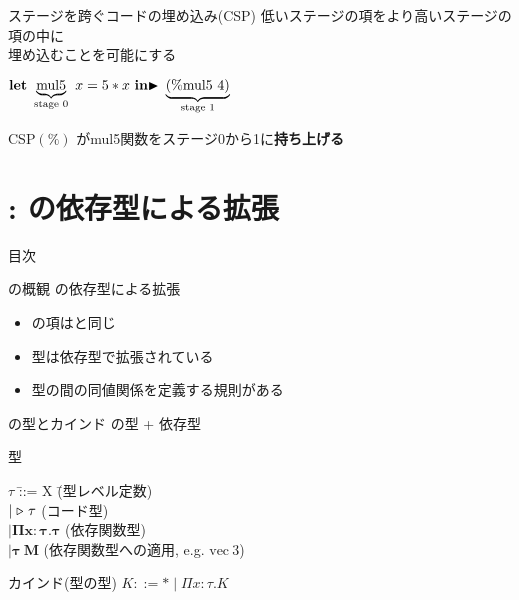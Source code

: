 \documentclass[dvipdfmx,aspectratio=169, 20pt]{beamer}
\begin{document}
\begin{frame}[fragile]{ステージを跨ぐコードの埋め込み(CSP)}
    低いステージの項をより高いステージの項の中に\\
    埋め込むことを可能にする \\[3mm]

    \begin{exampleblock}{}
    \begin{center}
        \( \textbf{let}\ \underbrace{\text{mul5}}_{\text{stage }0}\ x = 5 * x\ \textbf{in} {\mathop{\blacktriangleright}}\ \underbrace{(\% \text{mul5}\ 4)}_{\text{stage }1} \)
    \end{center}
    \end{exampleblock}
    CSP\( (\%) \) がmul5関数をステージ0から1に{\bf{持ち上げる}} \\
\end{frame}

\section{\LMD: \LTP の依存型による拡張}

\begin{frame}{目次}
    \tableofcontents[currentsection]
\end{frame}

\begin{frame}[fragile]{\LMD の概観}
    \LTP の依存型による拡張
    \begin{itemize}
        \item \LMD の項は\LTP と同じ
        \item 型は依存型で拡張されている
        \item 型の間の同値関係を定義する規則がある
    \end{itemize}
\end{frame}

\begin{frame}[fragile]{\LMD の型とカインド}
    \LTP の型 + 依存型
    \begin{block}{型}
        \begin{tabbing}
            \hspace{5mm} \( \tau \) \= ::= X \hspace{20mm} \= (型レベル定数) \\
            \> \( \mid {\mathop{\triangleright}}\ \tau \) \> (コード型) \\
            \> \( \bm{\mid \Pi x:\tau.\tau} \) \> (依存関数型) \\
            \> \( \bm{\mid \tau\ M} \) \> (依存関数型への適用, e.g. \(\text{vec}\ 3\))
        \end{tabbing}
    \end{block}
    \begin{block}{カインド(型の型)}
        \( K ::= * \mid \Pi x:\tau.K \)
    \end{block}
\end{frame}
\end{document}
